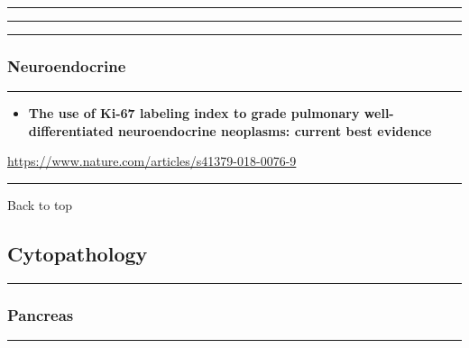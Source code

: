 \documentclass[]{article}
\providecommand{\tightlist}{%
  \setlength{\itemsep}{0pt}\setlength{\parskip}{0pt}}
\begin{document}
\begin{center}\rule{0.5\linewidth}{\linethickness}\end{center}

\begin{center}\rule{0.5\linewidth}{\linethickness}\end{center}

\begin{center}\rule{0.5\linewidth}{\linethickness}\end{center}

\hypertarget{neuroendocrine}{%
\subsubsection{Neuroendocrine}\label{neuroendocrine}}

\begin{center}\rule{0.5\linewidth}{\linethickness}\end{center}

\begin{itemize}
\tightlist
\item
  \textbf{The use of Ki-67 labeling index to grade pulmonary
  well-differentiated neuroendocrine neoplasms: current best evidence}
\end{itemize}

\url{https://www.nature.com/articles/s41379-018-0076-9}

\begin{center}\rule{0.5\linewidth}{\linethickness}\end{center}

Back to top

\pagebreak

\hypertarget{cytopathology}{%
\subsection{Cytopathology}\label{cytopathology}}

\begin{center}\rule{0.5\linewidth}{\linethickness}\end{center}

\hypertarget{pancreas-1}{%
\subsubsection{Pancreas}\label{pancreas-1}}

\begin{center}\rule{0.5\linewidth}{\linethickness}\end{center}
\end{document}

